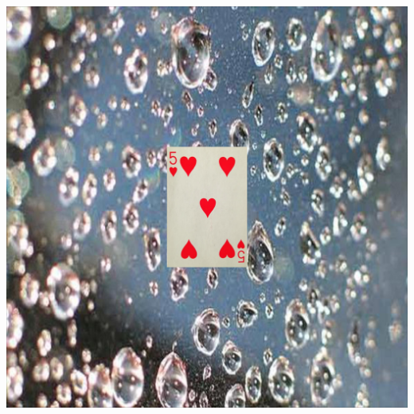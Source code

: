 \documentclass[a4paper]{article}
\begin{document}
\begin{minipage}{\columnwidth}
{\includegraphics[scale=0.04]{5h_1}}  \qquad 
{}
\end{minipage}
\end{document}
